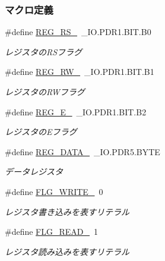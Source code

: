 \subsubsection*{マクロ定義}
\begin{DoxyCompactItemize}
\item 
\#define \hyperlink{lcd__def_8h_aa18b7c557b2b495f552189b74340f7a1_aa18b7c557b2b495f552189b74340f7a1}{R\+E\+G\+\_\+\+R\+S\+\_\+}~\+\_\+\+I\+O.\+P\+D\+R1.\+B\+I\+T.\+B0
\begin{DoxyCompactList}\small\item\em レジスタの\+R\+Sフラグ \end{DoxyCompactList}\item 
\#define \hyperlink{lcd__def_8h_ac8bbcd8783d3c1fb361aaafc6da6c1c6_ac8bbcd8783d3c1fb361aaafc6da6c1c6}{R\+E\+G\+\_\+\+R\+W\+\_\+}~\+\_\+\+I\+O.\+P\+D\+R1.\+B\+I\+T.\+B1
\begin{DoxyCompactList}\small\item\em レジスタの\+R\+Wフラグ \end{DoxyCompactList}\item 
\#define \hyperlink{lcd__def_8h_a450bb88fc561fac83cf5bbd024ce9747_a450bb88fc561fac83cf5bbd024ce9747}{R\+E\+G\+\_\+\+E\+\_\+}~\+\_\+\+I\+O.\+P\+D\+R1.\+B\+I\+T.\+B2
\begin{DoxyCompactList}\small\item\em レジスタの\+Eフラグ \end{DoxyCompactList}\item 
\#define \hyperlink{lcd__def_8h_a777575796174476e6a20bed751e7b143_a777575796174476e6a20bed751e7b143}{R\+E\+G\+\_\+\+D\+A\+T\+A\+\_\+}~\+\_\+\+I\+O.\+P\+D\+R5.\+B\+Y\+T\+E
\begin{DoxyCompactList}\small\item\em データレジスタ \end{DoxyCompactList}\item 
\#define \hyperlink{lcd__def_8h_afad612e1d187e74acde49431c5f7e8d1_afad612e1d187e74acde49431c5f7e8d1}{F\+L\+G\+\_\+\+W\+R\+I\+T\+E\+\_\+}~0
\begin{DoxyCompactList}\small\item\em レジスタ書き込みを表すリテラル \end{DoxyCompactList}\item 
\#define \hyperlink{lcd__def_8h_a36018355603fcc742f68a89ffadbebff_a36018355603fcc742f68a89ffadbebff}{F\+L\+G\+\_\+\+R\+E\+A\+D\+\_\+}~1
\begin{DoxyCompactList}\small\item\em レジスタ読み込みを表すリテラル \end{DoxyCompactList}\item 

\end{DoxyCompactItemize}

